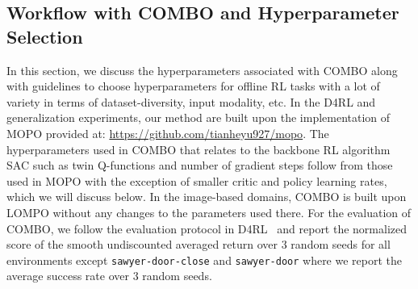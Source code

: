 \subsection{Workflow with COMBO and Hyperparameter Selection}
\label{app:hyperparameter}

In this section, we discuss the hyperparameters associated with COMBO along with guidelines to choose hyperparameters for offline RL tasks with a lot of variety in terms of dataset-diversity, input modality, etc. In the D4RL and generalization experiments, our method are built upon the implementation of MOPO provided at: \url{https://github.com/tianheyu927/mopo}. The hyperparameters used in COMBO that relates to the backbone RL algorithm SAC such as twin Q-functions and number of gradient steps follow from those used in MOPO with the exception of smaller critic and policy learning rates, which we will discuss below. In the image-based domains, COMBO is built upon LOMPO without any changes to the parameters used there. For the evaluation of COMBO, we follow the evaluation protocol in D4RL~\citep{fu2020d4rl} and report the normalized score of the smooth undiscounted averaged return over $3$ random seeds for all environments except \texttt{sawyer-door-close} and \texttt{sawyer-door} where we report the average success rate over $3$ random seeds. 

